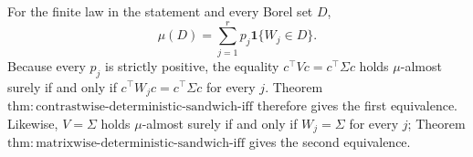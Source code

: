 For the finite law in the statement and every Borel set \(D\),
\[
 \mu(D)=\sum_{j=1}^rp_j\mathbf1\{W_j\in D\}.
\tag{1}
\]
Because every \(p_j\) is strictly positive, the equality
\(c^\top Vc=c^\top\Sigma c\) holds \(\mu\)-almost surely if and only if
\(c^\top W_jc=c^\top\Sigma c\) for every \(j\).  Theorem
\(\mathrm{thm:contrastwise\text{-}deterministic\text{-}sandwich\text{-}iff}\)
therefore gives the first equivalence.  Likewise, \(V=\Sigma\) holds
\(\mu\)-almost surely if and only if \(W_j=\Sigma\) for every \(j\);
Theorem
\(\mathrm{thm:matrixwise\text{-}deterministic\text{-}sandwich\text{-}iff}\)
gives the second equivalence.